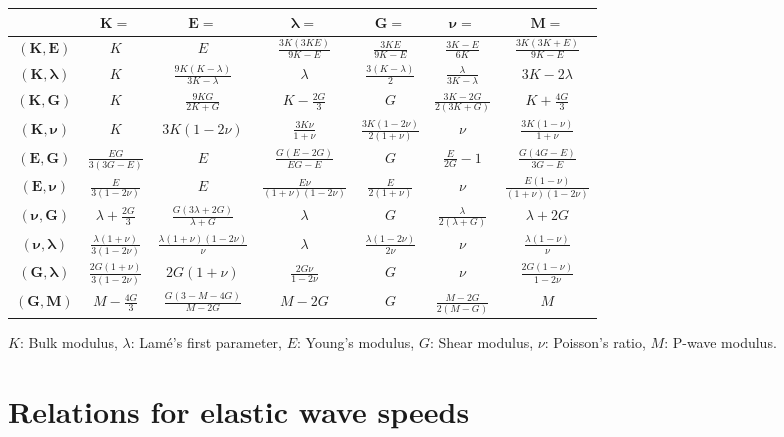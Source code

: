 \documentclass[12pt,letterpaper]{article}
\newcommand*{\bs}[1]{\boldsymbol{#1}}
\begin{document}
\begin{table}[h]
\centering
\begin{tabular}{ccccccc}
\hline 
&$\bs{K}=$  &$\bs{E}=$  &$\bs{\lambda}=$  &$\bs{G}=$  &$\bs{\nu}=$  &$\bs{M}=$ \\
\hline 
$\bs{(K,E)}$  &$K$ &$E$ &$\frac{3K(3KE)}{9K-E}$ &$\frac{3KE}{9K-E}$ &$\frac{3K-E}{6K}$ &$\frac{3K(3K+E)}{9K-E}$\\
$\bs{(K,\lambda)}$ &$K$ &$\frac{9K(K-\lambda)}{3K-\lambda}$ &$\lambda$ &$\frac{3(K-\lambda)}{2}$ &$\frac{\lambda}{3K-\lambda}$ &$3K-2\lambda$\\
$\bs{(K,G)}$ &$K$ &$\frac{9KG}{2K+G}$ &$K-\frac{2G}{3}$ &$G$ &$\frac{3K-2G}{2(3K+G)}$ &$K+\frac{4G}{3}$\\ 
$\bs{(K,\nu)}$ &$K$ &$3K(1-2\nu)$ &$\frac{3K\nu}{1+\nu}$ &$\frac{3K(1-2\nu)}{2(1+\nu)}$ &$\nu$ &$\frac{3K(1-\nu)}{1+\nu}$\\
$\bs{(E,G)}$ &$\frac{EG}{3(3G-E)}$ &$E$ &$\frac{G(E-2G)}{EG-E}$ &$G$ &$\frac{E}{2G}-1$ &$\frac{G(4G-E)}{3G-E}$\\
$\bs{(E,\nu)}$ &$\frac{E}{3(1-2\nu)}$ &$E$ &$\frac{E\nu}{(1+\nu)(1-2\nu)}$ &$\frac{E}{2(1+\nu)}$ &$\nu$ &$\frac{E(1-\nu)}{(1+\nu)(1-2\nu)}$\\
$\bs{(\nu,G)}$ &$\lambda+\frac{2G}{3}$ &$\frac{G(3\lambda+2G)}{\lambda+G}$ &$\lambda$ &$G$ &$\frac{\lambda}{2(\lambda+G)}$ &$\lambda+2G$\\
$\bs{(\nu,\lambda)}$ &$\frac{\lambda(1+\nu)}{3(1-2\nu)}$ &$\frac{\lambda(1+\nu)(1-2\nu)}{\nu}$ &$\lambda$ &$\frac{\lambda(1-2\nu)}{2\nu}$ &$\nu$ &$\frac{\lambda(1-\nu)}{\nu}$\\
$\bs{(G,\lambda)}$ &$\frac{2G(1+\nu)}{3(1-2\nu)}$ &$2G(1+\nu)$ &$\frac{2G\nu}{1-2\nu}$ &$G$ &$\nu$ &$\frac{2G(1-\nu)}{1-2\nu}$ \\ 
$\bs{(G,M)}$ &$M-\frac{4G}{3}$& $\frac{G(3-M-4G)}{M-2G}$ &$M-2G$ &$G$ &$\frac{M-2G}{2(M-G)}$ &$M$\\
\hline 
\end{tabular}
\label{tab:elastic_constants}
\end{table}

$K$: Bulk modulus, $\lambda$: Lamé's first parameter, $E$: Young's
modulus, $G$: Shear modulus, $\nu$: Poisson's ratio, $M$: P-wave
modulus.


\section{Relations for elastic wave speeds}
\end{document}
